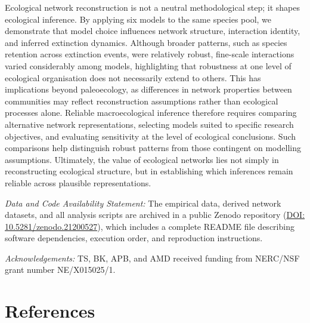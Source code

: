 \documentclass[
]{article}
\begin{document}
Ecological network reconstruction is not a neutral methodological step;
it shapes ecological inference. By applying six models to the same
species pool, we demonstrate that model choice influences network
structure, interaction identity, and inferred extinction dynamics.
Although broader patterns, such as species retention across extinction
events, were relatively robust, fine-scale interactions varied
considerably among models, highlighting that robustness at one level of
ecological organisation does not necessarily extend to others. This has
implications beyond paleoecology, as differences in network properties
between communities may reflect reconstruction assumptions rather than
ecological processes alone. Reliable macroecological inference therefore
requires comparing alternative network representations, selecting models
suited to specific research objectives, and evaluating sensitivity at
the level of ecological conclusions. Such comparisons help distinguish
robust patterns from those contingent on modelling assumptions.
Ultimately, the value of ecological networks lies not simply in
reconstructing ecological structure, but in establishing which
inferences remain reliable across plausible representations.

\emph{Data and Code Availability Statement:} The empirical data, derived
network datasets, and all analysis scripts are archived in a public
Zenodo repository (\href{https://doi.org/10.5281/zenodo.21200527}{DOI:
10.5281/zenodo.21200527}), which includes a complete README file
describing software dependencies, execution order, and reproduction
instructions.

\emph{Acknowledgements:} TS, BK, APB, and AMD received funding from
NERC/NSF grant number NE/X015025/1.

\section*{References}\label{references}
\end{document}
